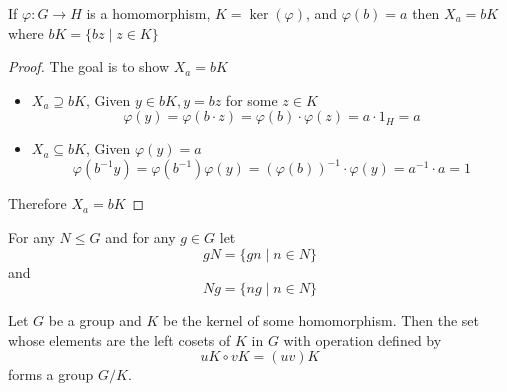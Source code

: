 \begin{lemma}
  If $\varphi: G \to H$ is a homomorphism, $K = \ker(\varphi)$, and $\varphi(b) = a$ 
  then $X_a = bK$ where $bK = \{bz \mid z \in K\}$
\end{lemma}

\begin{proof}
  The goal is to show $X_a = bK$
  \begin{itemize}
    \item $X_a \supseteq bK$, Given $y \in bK, y = bz$ for some $z \in K$
    \[\varphi(y) = \varphi(b\cdot z) = \varphi(b)\cdot\varphi(z) = a \cdot 1_H = a\]
    \item $X_a \subseteq bK$, Given $\varphi(y) = a$
    \[\varphi(b^{-1}y) = \varphi(b^{-1})\varphi(y) = (\varphi(b))^{-1}\cdot\varphi(y) = a^{-1}\cdot a = 1\]
  \end{itemize}
  Therefore $X_a = bK$
\end{proof}




\begin{definition}
  For any $N \le G$ and for any $g \in G$ let 
  \[gN = \{gn \mid n \in N\}\]
  and 
  \[Ng = \{ng \mid n \in N\}\]
\end{definition}

\begin{theorem}
  Let $G$ be a group and $K$ be the kernel of some homomorphism. 
  Then the set whose elements are the left cosets of $K$ in $G$ with operation defined by
  \[uK \circ vK = (uv)K\]
  forms a group $G/K$.
\end{theorem}

